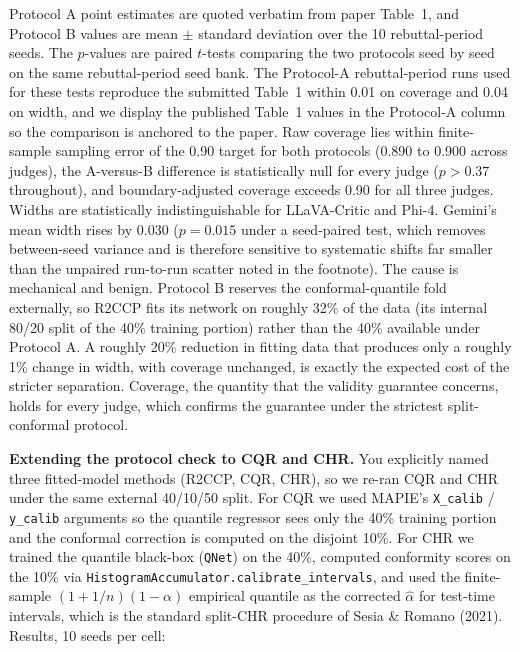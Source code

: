 \documentclass[11pt]{article}
\begin{document}
Protocol A point estimates are quoted verbatim from paper Table~1, and Protocol B values are mean $\pm$ standard deviation over the 10 rebuttal-period seeds. The $p$-values are paired $t$-tests comparing the two protocols seed by seed on the same rebuttal-period seed bank. The Protocol-A rebuttal-period runs used for these tests reproduce the submitted Table~1 within 0.01 on coverage and 0.04 on width, and we display the published Table~1 values in the Protocol-A column so the comparison is anchored to the paper. Raw coverage lies within finite-sample sampling error of the 0.90 target for both protocols (0.890 to 0.900 across judges), the A-versus-B difference is statistically null for every judge ($p > 0.37$ throughout), and boundary-adjusted coverage exceeds 0.90 for all three judges. Widths are statistically indistinguishable for LLaVA-Critic and Phi-4. Gemini's mean width rises by 0.030 ($p = 0.015$ under a seed-paired test, which removes between-seed variance and is therefore sensitive to systematic shifts far smaller than the unpaired run-to-run scatter noted in the footnote). The cause is mechanical and benign. Protocol B reserves the conformal-quantile fold externally, so R2CCP fits its network on roughly 32\% of the data (its internal 80/20 split of the 40\% training portion) rather than the 40\% available under Protocol A. A roughly 20\% reduction in fitting data that produces only a roughly 1\% change in width, with coverage unchanged, is exactly the expected cost of the stricter separation. Coverage, the quantity that the validity guarantee concerns, holds for every judge, which confirms the guarantee under the strictest split-conformal protocol.

\textbf{Extending the protocol check to CQR and CHR.} You explicitly named three fitted-model methods (R2CCP, CQR, CHR), so we re-ran CQR and CHR under the same external 40/10/50 split. For CQR we used MAPIE's \texttt{X\_calib} / \texttt{y\_calib} arguments so the quantile regressor sees only the 40\% training portion and the conformal correction is computed on the disjoint 10\%. For CHR we trained the quantile black-box (\texttt{QNet}) on the 40\%, computed conformity scores on the 10\% via \texttt{HistogramAccumulator.}\allowbreak\texttt{calibrate\_intervals}, and used the finite-sample $(1+1/n)(1-\alpha)$ empirical quantile as the corrected $\hat{\alpha}$ for test-time intervals, which is the standard split-CHR procedure of Sesia \& Romano (2021). Results, 10 seeds per cell:
\end{document}
